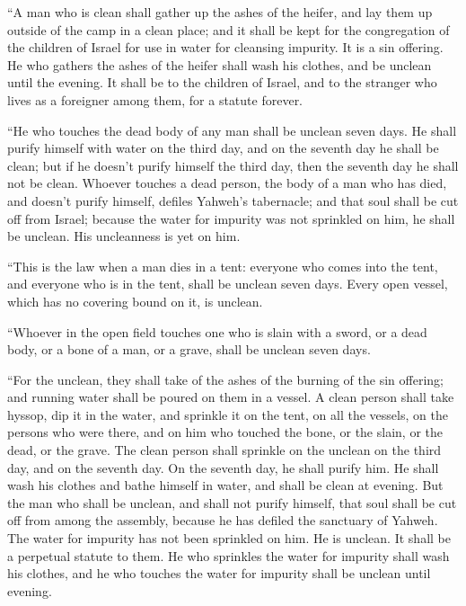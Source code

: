  ``A man who is clean shall gather up the ashes of the
heifer, and lay them up outside of the camp in a clean place; and it
shall be kept for the congregation of the children of Israel for use in
water for cleansing impurity. It is a sin offering.  He
who gathers the ashes of the heifer shall wash his clothes, and be
unclean until the evening. It shall be to the children of Israel, and to
the stranger who lives as a foreigner among them, for a statute forever.

 ``He who touches the dead body of any man shall be
unclean seven days.  He shall purify himself with water
on the third day, and on the seventh day he shall be clean; but if he
doesn't purify himself the third day, then the seventh day he shall not
be clean.  Whoever touches a dead person, the body of a
man who has died, and doesn't purify himself, defiles Yahweh's
tabernacle; and that soul shall be cut off from Israel; because the
water for impurity was not sprinkled on him, he shall be unclean. His
uncleanness is yet on him.

 ``This is the law when a man dies in a tent: everyone
who comes into the tent, and everyone who is in the tent, shall be
unclean seven days.  Every open vessel, which has no
covering bound on it, is unclean.

 ``Whoever in the open field touches one who is slain
with a sword, or a dead body, or a bone of a man, or a grave, shall be
unclean seven days.

 ``For the unclean, they shall take of the ashes of the
burning of the sin offering; and running water shall be poured on them
in a vessel.  A clean person shall take hyssop, dip it in
the water, and sprinkle it on the tent, on all the vessels, on the
persons who were there, and on him who touched the bone, or the slain,
or the dead, or the grave.  The clean person shall
sprinkle on the unclean on the third day, and on the seventh day. On the
seventh day, he shall purify him. He shall wash his clothes and bathe
himself in water, and shall be clean at evening.  But the
man who shall be unclean, and shall not purify himself, that soul shall
be cut off from among the assembly, because he has defiled the sanctuary
of Yahweh. The water for impurity has not been sprinkled on him. He is
unclean.  It shall be a perpetual statute to them. He who
sprinkles the water for impurity shall wash his clothes, and he who
touches the water for impurity shall be unclean until evening.

